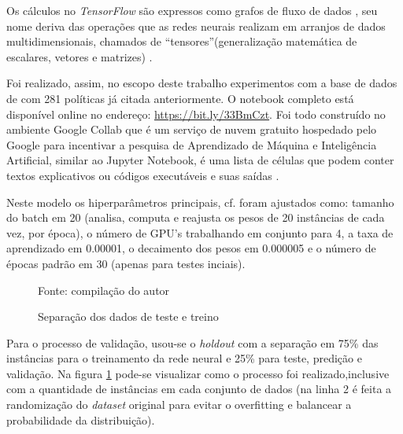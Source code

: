 Os cálculos no \textit{TensorFlow} são expressos como grafos de fluxo de dados , seu nome deriva das operações que as redes neurais realizam em arranjos de dados multidimensionais, chamados de ``tensores''(generalização matemática de escalares, vetores e matrizes) \cite{kadimisetty_tensorflow_2018}.

Foi realizado, assim, no escopo deste trabalho experimentos com a base de dados de com 281 políticas já citada anteriormente. O notebook completo está disponível online no endereço: \url{https://bit.ly/33BmCzt}. Foi todo construído no ambiente Google Collab que é um serviço de nuvem gratuito hospedado pelo Google para incentivar a pesquisa de Aprendizado de Máquina e Inteligência Artificial, similar ao Jupyter Notebook, é uma lista de células que podem conter textos explicativos ou códigos executáveis e suas saídas \cite{collab_2020}.

Neste modelo os hiperparâmetros principais, cf.  foram ajustados como: tamanho do batch em 20 (analisa, computa e reajusta os pesos de 20 instâncias de cada vez, por época), o número de GPU's trabalhando em conjunto para 4, a taxa de aprendizado em 0.00001, o decaimento dos pesos em 0.000005 e o número de épocas padrão em 30 (apenas para testes inciais).

\begin{figure}[h!]
	\centering
	\caption{Separação dos dados de teste e treino}
	
	\label{fig:separacao-teste-treino}
	{\scriptsize Fonte: compilação do autor}
\end{figure}

Para o processo de validação, usou-se o \textit{holdout} com a separação em 75\% das instâncias para o treinamento da rede neural e 25\% para teste, predição e validação. Na figura \ref{fig:separacao-teste-treino} pode-se visualizar como o processo foi realizado,inclusive com a quantidade de instâncias em cada conjunto de dados (na linha 2 é feita a randomização do \textit{dataset} original para evitar o overfitting e balancear a probabilidade da distribuição).

